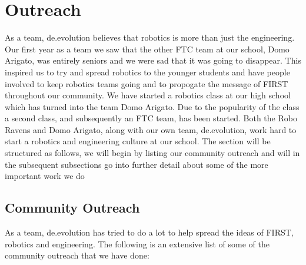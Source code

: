 \section{Outreach}

As a team, de.evolution believes that robotics is more than just the engineering. Our first year as a team we saw that the other FTC team at our school, Domo Arigato, was entirely seniors and we were sad that it was going to disappear. This inspired us to try and spread robotics to the younger students and have people involved to keep robotics teams going and to propogate the message of FIRST throughout our community. We have started a robotics class at our high school which has turned into the team Domo Arigato. Due to the popularity of the class a second class, and subsequently an FTC team, has been started. Both the Robo Ravens and Domo Arigato, along with our own team, de.evolution, work hard to start a robotics and engineering culture at our school. The section will be structured as follows, we will begin by listing our community outreach and will in the subsequent subsections go into further detail about some of the more important work we do

\subsection{Community Outreach}
As a team, de.evolution has tried to do a lot to help spread the ideas of FIRST, robotics and engineering. The following is an extensive list of some of the community outreach that we have done:

